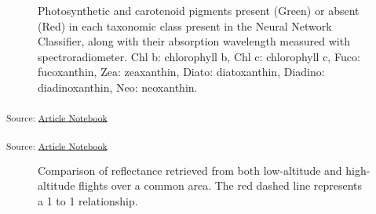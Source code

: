 \documentclass[
  number]{elsarticle}
\begin{document}
\label{cell-fig-Pigm}
\begin{figure}[H]


\caption{\label{fig-Pigm}Photosynthetic and carotenoid pigments present
(Green) or absent (Red) in each taxonomic class present in the Neural
Network Classifier, along with their absorption wavelength measured with
spectroradiometer. Chl b: chlorophyll b, Chl c: chlorophyll c, Fuco:
fucoxanthin, Zea: zeaxanthin, Diato: diatoxanthin, Diadino:
diadinoxanthin, Neo: neoxanthin.}

\end{figure}%

\textsubscript{Source:
\href{https://SigOiry.github.io/Drone_Paper_2023/index.qmd.html}{Article
Notebook}}

\textsubscript{Source:
\href{https://SigOiry.github.io/Drone_Paper_2023/index.qmd.html}{Article
Notebook}}

\label{cell-fig-CompareRef}
\begin{figure}[H]


\caption{\label{fig-CompareRef}Comparison of reflectance retrieved from
both low-altitude and high-altitude flights over a common area. The red
dashed line represents a 1 to 1 relationship.}

\end{figure}%
\end{document}
